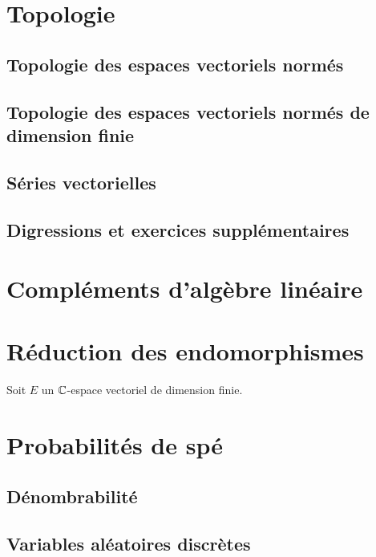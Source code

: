 \documentclass[12pt,a4paper]{exo_book}
\begin{document}
\chapter{Topologie}

\section{Topologie des espaces vectoriels normés}

\section{Topologie des espaces vectoriels normés de dimension finie}

\section{Séries vectorielles}

\section{Digressions et exercices supplémentaires}


\chapter{Compléments d'algèbre linéaire}

\chapter{Réduction des endomorphismes}

\begin{exo}
    Soit $E$ un $\mathbb{C}$-espace vectoriel de dimension finie.
\end{exo}


\chapter{Probabilités de spé}

\section{Dénombrabilité}

\section{Variables aléatoires discrètes}
\end{document}
